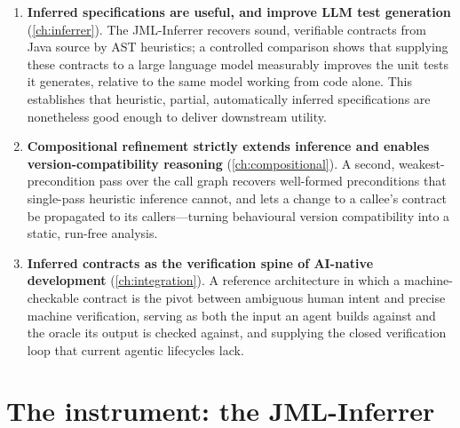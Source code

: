 \begin{enumerate}[leftmargin=1.8em]
  \item \textbf{Inferred specifications are useful, and improve LLM test
    generation} (\cref{ch:inferrer}). The JML-Inferrer recovers sound, verifiable
    contracts from Java source by AST heuristics; a controlled comparison shows
    that supplying these contracts to a large language model measurably improves
    the unit tests it generates, relative to the same model working from code
    alone. This establishes that heuristic, partial, automatically inferred
    specifications are nonetheless good enough to deliver downstream utility.

  \item \textbf{Compositional refinement strictly extends inference and enables
    version-compatibility reasoning} (\cref{ch:compositional}). A second,
    weakest-precondition pass over the call graph recovers well-formed
    preconditions that single-pass heuristic inference cannot, and lets a change to
    a callee's contract be propagated to its callers---turning behavioural version
    compatibility into a static, run-free analysis.

  \item \textbf{Inferred contracts as the verification spine of AI-native
    development} (\cref{ch:integration}). A reference architecture in which a
    machine-checkable contract is the pivot between ambiguous human intent and
    precise machine verification, serving as both the input an agent builds against
    and the oracle its output is checked against, and supplying the closed
    verification loop that current agentic lifecycles lack.
\end{enumerate}

\section{The instrument: the JML-Inferrer}

